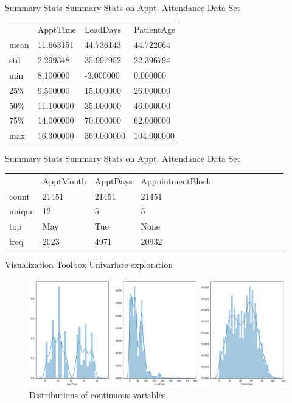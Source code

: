 \documentclass[10pt]{beamer}
\begin{document}
\begin{frame}{Summary Stats}  
Summary Stats on Appt. Attendance Data Set
	\begin{table}[]
	\begin{tabular}{llll}
    		 & ApptTime  & LeadDays   & PatientAge \\
		mean & 11.663151 &  44.736143  &  44.722064  \\
		std  &  2.299348 &  35.997952  &  22.396794  \\
		min  &  8.100000 &  -3.000000  &   0.000000  \\
		25\% &  9.500000 &  15.000000  &  26.000000  \\
		50\% & 11.100000 &  35.000000  &  46.000000  \\
		75\% & 14.000000 &  70.000000  &  62.000000  \\
		max  & 16.300000 & 369.000000 & 104.000000
	\end{tabular}
\end{table}

\end{frame}

\begin{frame}{Summary Stats}  
Summary Stats on Appt. Attendance Data Set
\begin{table}[]
\begin{tabular}{llllllllllll}
 & ApptMonth & ApptDays & AppointmentBlock & \\
count & 21451 & 21451 & 21451 & \\
unique & 12 & 5 & 5 &  \\
top & May & Tue & None & \\
freq & 2023 & 4971 & 20932 & 
\end{tabular}
\end{table}
\end{frame}

\begin{frame}{Visualization Toolbox}
Univariate exploration
	\begin{figure}	
		\caption{Distributions of continuous variables}
		\includegraphics[width=1.1\textwidth, center, trim=0cm 0cm 0 0cm]{images/numerical_distributions.png}
	\end{figure}
\end{frame}
\end{document}
